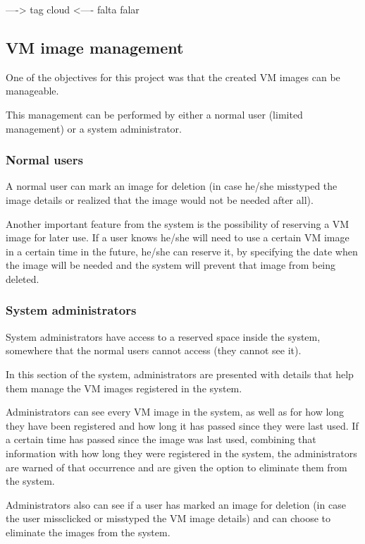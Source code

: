 ----> tag cloud <---- falta falar

\subsection{VM image management}\label{subsec:vm-manag}

One of the objectives for this project was that the created VM images can be manageable.

This management can be performed by either a normal user (limited management) or a system administrator.

\subsubsection{Normal users}

A normal user can mark an image for deletion (in case he/she misstyped the image details or realized that the image would not be needed after all).

Another important feature from the system is the possibility of reserving a VM image for later use. If a user knows he/she will need to use a certain VM image in a certain time in the future, he/she can reserve it, by specifying the date when the image will be needed and the system will prevent that image from being deleted.

\subsubsection{System administrators}

System administrators have access to a reserved space inside the system, somewhere that the normal users cannot access (they cannot see it).

In this section of the system, administrators are presented with details that help them manage the VM images registered in the system.

Administrators can see every VM image in the system, as well as for how long they have been registered and how long it has passed since they were last used. 
If a certain time has passed since the image was last used, combining that information with how long they were registered in the system, the administrators are warned of that occurrence and are given the option to eliminate them from the system.

Administrators also can see if a user has marked an image for deletion (in case the user missclicked or misstyped the VM image details) and can choose to eliminate the images from the system.




